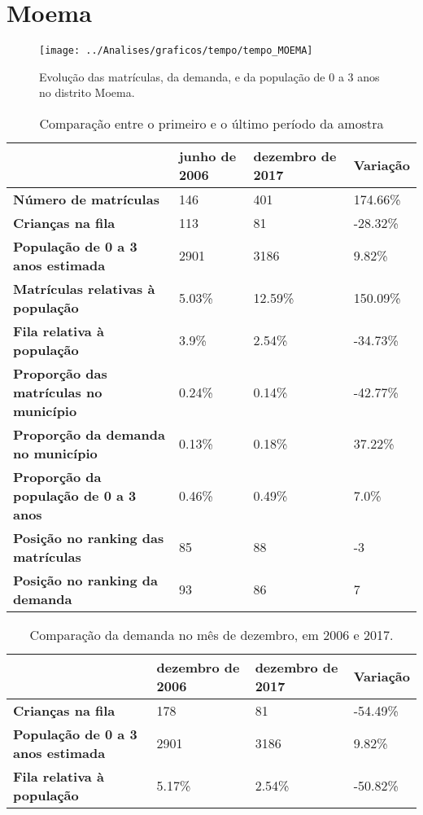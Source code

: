 \section{Moema}
\begin{figure}[H]
\centering
\texttt{[image: ../Analises/graficos/tempo/tempo\_MOEMA]}
\caption{Evolução das matrículas, da demanda, e da população de 0 a 3 anos no distrito Moema.}
\end{figure}
\begin{table}[H]
\begin{tabular}{|l|l|l|l|}
\hline
\textbf{}                                      & \textbf{junho de 2006}       & \textbf{dezembro de 2017}    & \textbf{Variação} \\ \hline
\textbf{Número de matrículas}                  & 146 & 401 & 174.66\% \\ \hline
\textbf{Crianças na fila}                      & 113 & 81 & -28.32\% \\ \hline
\textbf{População de 0 a 3 anos estimada}      & 2901 & 3186 & 9.82\% \\ \hline
\textbf{Matrículas relativas à população}      & 5.03\% & 12.59\% & 150.09\% \\ \hline
\textbf{Fila relativa à população}             & 3.9\% & 2.54\% & -34.73\% \\ \hline
\textbf{Proporção das matrículas no município} & 0.24\% & 0.14\% & -42.77\% \\ \hline
\textbf{Proporção da demanda no município}     & 0.13\% & 0.18\% & 37.22\% \\ \hline
\textbf{Proporção da população de 0 a 3 anos}  & 0.46\% & 0.49\% & 7.0\% \\ \hline
\textbf{Posição no ranking das matrículas}     & 85 & 88 & -3 \\ \hline
\textbf{Posição no ranking da demanda}         & 93 & 86 & 7 \\ \hline
\end{tabular}
\caption{Comparação entre o primeiro e o último período da amostra}
\end{table}
\begin{table}[H]
\begin{tabular}{|l|l|l|l|}
\hline
\textbf{}                                 & \textbf{dezembro de 2006} & \textbf{dezembro de 2017} & \textbf{Variação} \\ \hline
\textbf{Crianças na fila}                      & 178 & 81 & -54.49\% \\ \hline
\textbf{População de 0 a 3 anos estimada}      & 2901 & 3186 & 9.82\% \\ \hline
\textbf{Fila relativa à população}             & 5.17\% & 2.54\% & -50.82\% \\ \hline
\end{tabular}
\caption{Comparação da demanda no mês de dezembro, em 2006 e 2017.}
\end{table}
